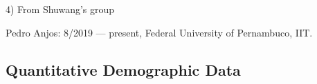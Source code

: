 \documentclass[11pt]{article}
\begin{document}
     4) From Shuwang’s group

     Pedro Anjos: 8/2019 — present, Federal University of Pernambuco, IIT.




\subsection{Quantitative Demographic Data}









\newpage
{}
\renewcommand{\thepage} {\arabic{page}}


% 
%

%
\end{document}
